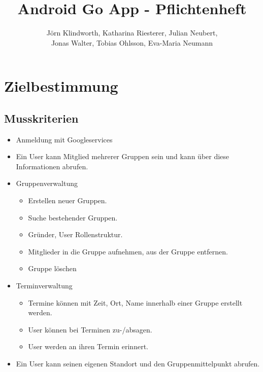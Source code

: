 \documentclass{scrartcl}
\title{Android Go App - Pflichtenheft}
\author{Jörn Klindworth, Katharina Riesterer, Julian Neubert,\\ Jonas Walter, Tobias Ohlsson, Eva-Maria Neumann}
\begin{document}
	\maketitle
	\newpage
	
	\tableofcontents
	\newpage
	
	\section{Zielbestimmung}
	\subsection{Musskriterien}
	\begin{itemize}
		\item Anmeldung mit Googleservices
		\item Ein User kann Mitglied mehrerer Gruppen sein und kann über diese Informationen abrufen.
		\item Gruppenverwaltung
		\begin{itemize}
			\item Erstellen neuer Gruppen.
			\item Suche bestehender Gruppen.
			\item Gründer, User Rollenstruktur.
			\item Mitglieder in die Gruppe aufnehmen, aus der Gruppe entfernen.
			\item Gruppe löschen
		\end{itemize}
		\item Terminverwaltung
		\begin{itemize}
			\item Termine können mit Zeit, Ort, Name innerhalb einer Gruppe erstellt werden.
			\item User können bei Terminen zu-/absagen.
			\item User werden an ihren Termin erinnert.
		\end{itemize}
		\item Ein User kann seinen eigenen Standort und den Gruppenmittelpunkt abrufen.	
	\end{itemize}
\end{document}
